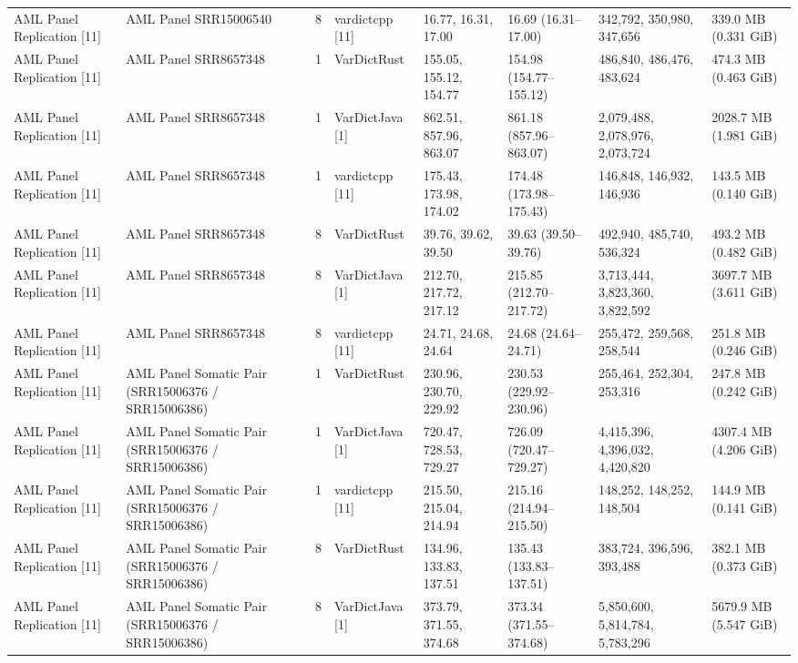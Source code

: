 \begin{table}[htbp]
{\begin{tabular}{llllllll}
AML Panel Replication [11] & AML Panel SRR15006540 & 8 & vardictcpp [11] & 16.77, 16.31, 17.00 & 16.69 (16.31--17.00) & 342,792, 350,980, 347,656 & 339.0 MB (0.331 GiB) \\
AML Panel Replication [11] & AML Panel SRR8657348 & 1 & VarDictRust & 155.05, 155.12, 154.77 & 154.98 (154.77--155.12) & 486,840, 486,476, 483,624 & 474.3 MB (0.463 GiB) \\
AML Panel Replication [11] & AML Panel SRR8657348 & 1 & VarDictJava [1] & 862.51, 857.96, 863.07 & 861.18 (857.96--863.07) & 2,079,488, 2,078,976, 2,073,724 & 2028.7 MB (1.981 GiB) \\
AML Panel Replication [11] & AML Panel SRR8657348 & 1 & vardictcpp [11] & 175.43, 173.98, 174.02 & 174.48 (173.98--175.43) & 146,848, 146,932, 146,936 & 143.5 MB (0.140 GiB) \\
AML Panel Replication [11] & AML Panel SRR8657348 & 8 & VarDictRust & 39.76, 39.62, 39.50 & 39.63 (39.50--39.76) & 492,940, 485,740, 536,324 & 493.2 MB (0.482 GiB) \\
AML Panel Replication [11] & AML Panel SRR8657348 & 8 & VarDictJava [1] & 212.70, 217.72, 217.12 & 215.85 (212.70--217.72) & 3,713,444, 3,823,360, 3,822,592 & 3697.7 MB (3.611 GiB) \\
AML Panel Replication [11] & AML Panel SRR8657348 & 8 & vardictcpp [11] & 24.71, 24.68, 24.64 & 24.68 (24.64--24.71) & 255,472, 259,568, 258,544 & 251.8 MB (0.246 GiB) \\
AML Panel Replication [11] & AML Panel Somatic Pair (SRR15006376 / SRR15006386) & 1 & VarDictRust & 230.96, 230.70, 229.92 & 230.53 (229.92--230.96) & 255,464, 252,304, 253,316 & 247.8 MB (0.242 GiB) \\
AML Panel Replication [11] & AML Panel Somatic Pair (SRR15006376 / SRR15006386) & 1 & VarDictJava [1] & 720.47, 728.53, 729.27 & 726.09 (720.47--729.27) & 4,415,396, 4,396,032, 4,420,820 & 4307.4 MB (4.206 GiB) \\
AML Panel Replication [11] & AML Panel Somatic Pair (SRR15006376 / SRR15006386) & 1 & vardictcpp [11] & 215.50, 215.04, 214.94 & 215.16 (214.94--215.50) & 148,252, 148,252, 148,504 & 144.9 MB (0.141 GiB) \\
AML Panel Replication [11] & AML Panel Somatic Pair (SRR15006376 / SRR15006386) & 8 & VarDictRust & 134.96, 133.83, 137.51 & 135.43 (133.83--137.51) & 383,724, 396,596, 393,488 & 382.1 MB (0.373 GiB) \\
AML Panel Replication [11] & AML Panel Somatic Pair (SRR15006376 / SRR15006386) & 8 & VarDictJava [1] & 373.79, 371.55, 374.68 & 373.34 (371.55--374.68) & 5,850,600, 5,814,784, 5,783,296 & 5679.9 MB (5.547 GiB) \\

\end{tabular}}
\end{table}
